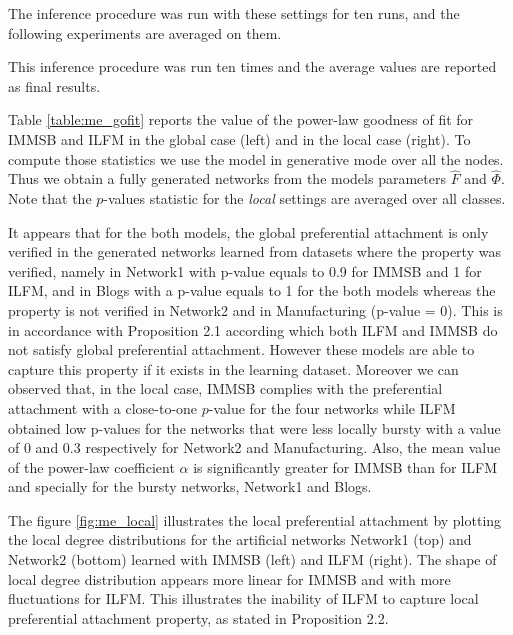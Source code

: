 The inference procedure was run with these settings for ten runs, and the following experiments are averaged on them.

This inference procedure was run ten times and the average values are reported as final results.

Table \ref{table:me_gofit} reports the value of the power-law goodness of fit for IMMSB and ILFM in the global case (left) and in the local case (right). To compute those statistics we use the model in generative mode over all the nodes. Thus we obtain a fully generated networks from the models parameters $\hat F$ and $\hat \Phi$. Note that the $p$-values statistic for the \emph{local} settings are averaged over all classes.

It appears that for the both models, the global preferential attachment is only verified in the generated networks learned from datasets where the property was verified, namely in Network1 with p-value equals to 0.9 for IMMSB and 1 for ILFM, and in Blogs with a p-value equals to 1 for the both models whereas the property is not verified in Network2 and in Manufacturing (p-value = 0). This is in accordance with Proposition 2.1  according which both ILFM and IMMSB do not satisfy global preferential attachment. However these models are able to capture this property if it exists in the learning dataset.  Moreover we can observed that, in the local case, IMMSB complies with the preferential attachment with a close-to-one $p$-value for the four networks while ILFM obtained low p-values for the networks that were less locally bursty with a value of 0 and 0.3 respectively for Network2 and Manufacturing. Also, the mean value of the power-law coefficient $\alpha$ is significantly greater for IMMSB than for ILFM and specially for the bursty networks, Network1 and Blogs.

The figure \ref{fig:me_local} illustrates the local preferential attachment by plotting the local degree distributions for the artificial networks Network1 (top) and Network2 (bottom) learned with IMMSB (left) and ILFM (right). The shape of local degree distribution appears more linear for IMMSB and with more fluctuations for ILFM. This illustrates the inability  of ILFM to capture local preferential attachment property,  as stated in Proposition 2.2. 
 

